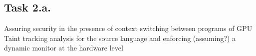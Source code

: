 \subsection{Task 2.a.} 

Assuring security in the presence of context switching between programs of GPU
Taint tracking analysis for the source language and enforcing (assuming?) a dynamic monitor at the hardware level
